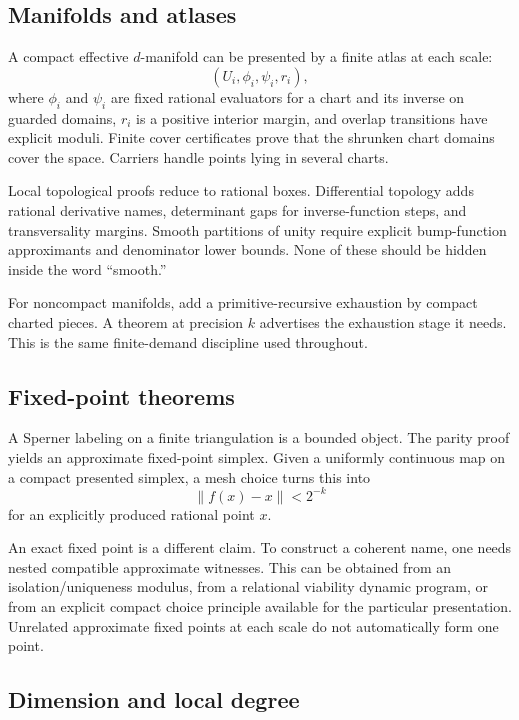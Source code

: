 \subsection{Manifolds and atlases}

A compact effective $d$-manifold can be presented by a finite atlas at each scale:
\[
  (U_i,\phi_i,\psi_i,r_i),
\]
where $\phi_i$ and $\psi_i$ are fixed rational evaluators for a chart and its inverse on guarded domains, $r_i$ is a positive interior margin, and overlap transitions have explicit moduli.  Finite cover certificates prove that the shrunken chart domains cover the space.  Carriers handle points lying in several charts.

Local topological proofs reduce to rational boxes.  Differential topology adds rational derivative names, determinant gaps for inverse-function steps, and transversality margins.  Smooth partitions of unity require explicit bump-function approximants and denominator lower bounds.  None of these should be hidden inside the word ``smooth.''

For noncompact manifolds, add a primitive-recursive exhaustion by compact charted pieces.  A theorem at precision $k$ advertises the exhaustion stage it needs.  This is the same finite-demand discipline used throughout.

\subsection{Fixed-point theorems}

A Sperner labeling on a finite triangulation is a bounded object.  The parity proof yields an approximate fixed-point simplex.  Given a uniformly continuous map on a compact presented simplex, a mesh choice turns this into
\[
  \|f(x)-x\|<2^{-k}
\]
for an explicitly produced rational point $x$.

An exact fixed point is a different claim.  To construct a coherent name, one needs nested compatible approximate witnesses.  This can be obtained from an isolation/uniqueness modulus, from a relational viability dynamic program, or from an explicit compact choice principle available for the particular presentation.  Unrelated approximate fixed points at each scale do not automatically form one point.

\subsection{Dimension and local degree}

